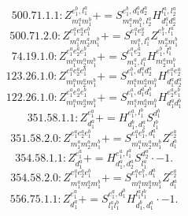 \documentclass[letterpaper,10pt,fleqn,leqno,onecolumn]{article}
\begin{document}
\begin{equation} \;\;\;\;\;\;  500.71.1.1: Z^{e_{1}^{b},l_{1}^{a}}_{m_{1}^{a}m_{1}^{b}}+=S^{e_{1}^{b},d_{1}^{a}d_{2}^{a}}_{m_{1}^{a}m_{1}^{b},l_{2}^{a}}H^{l_{1}^{a},l_{2}^{a}}_{d_{1}^{a}d_{2}^{a}} \end{equation}
\begin{equation} \;\;\;\;\;\;  500.71.2.0: Z^{e_{1}^{a}e_{2}^{a}e_{1}^{b}}_{m_{1}^{a}m_{2}^{a}m_{1}^{b}}+=S^{e_{1}^{a}e_{2}^{a}}_{m_{1}^{a},l_{1}^{a}}Z^{e_{1}^{b},l_{1}^{a}}_{m_{2}^{a}m_{1}^{b}} \end{equation}
\begin{equation} \;\;\;\;\;\;  74.19.1.0: Z^{e_{1}^{a}e_{2}^{a}e_{1}^{b}}_{m_{1}^{a}m_{2}^{a}m_{1}^{b}}+=S^{e_{1}^{a}e_{2}^{a}}_{m_{1}^{a},l_{1}^{a}}H^{e_{1}^{b},l_{1}^{a}}_{m_{2}^{a}m_{1}^{b}} \end{equation}
\begin{equation} \;\;\;\;\;\;  123.26.1.0: Z^{e_{1}^{a}e_{2}^{a}e_{1}^{b}}_{m_{1}^{a}m_{2}^{a}m_{1}^{b}}+=S^{e_{1}^{b},d_{1}^{a}d_{2}^{a}}_{m_{1}^{a}m_{2}^{a}m_{1}^{b}}H^{e_{1}^{a}e_{2}^{a}}_{d_{1}^{a}d_{2}^{a}} \end{equation}
\begin{equation} \;\;\;\;\;\;  122.26.1.0: Z^{e_{1}^{a}e_{2}^{a}e_{1}^{b}}_{m_{1}^{a}m_{2}^{a}m_{1}^{b}}+=S^{e_{1}^{a},d_{1}^{a}d_{1}^{b}}_{m_{1}^{a}m_{2}^{a}m_{1}^{b}}H^{e_{2}^{a}e_{1}^{b}}_{d_{1}^{a}d_{1}^{b}} \end{equation}
\begin{equation} \;\;\;\;\;\;  351.58.1.1: Z^{e_{1}^{a}}_{d_{1}^{a}}+=H^{e_{1}^{a},l_{1}^{b}}_{d_{1}^{b},d_{1}^{a}}S^{d_{1}^{b}}_{l_{1}^{b}} \end{equation}
\begin{equation} \;\;\;\;\;\;  351.58.2.0: Z^{e_{1}^{a}e_{2}^{a}e_{1}^{b}}_{m_{1}^{a}m_{2}^{a}m_{1}^{b}}+=S^{e_{1}^{a}e_{1}^{b},d_{1}^{a}}_{m_{1}^{a}m_{2}^{a}m_{1}^{b}}Z^{e_{2}^{a}}_{d_{1}^{a}} \end{equation}
\begin{equation} \;\;\;\;\;\;  354.58.1.1: Z^{e_{1}^{a}}_{d_{1}^{a}}+=H^{e_{1}^{a},l_{1}^{a}}_{d_{1}^{a},d_{2}^{a}}S^{d_{2}^{a}}_{l_{1}^{a}}\cdot -1. \end{equation}
\begin{equation} \;\;\;\;\;\;  354.58.2.0: Z^{e_{1}^{a}e_{2}^{a}e_{1}^{b}}_{m_{1}^{a}m_{2}^{a}m_{1}^{b}}+=S^{e_{1}^{a}e_{1}^{b},d_{1}^{a}}_{m_{1}^{a}m_{2}^{a}m_{1}^{b}}Z^{e_{2}^{a}}_{d_{1}^{a}} \end{equation}
\begin{equation} \;\;\;\;\;\;  556.75.1.1: Z^{e_{1}^{a}}_{d_{1}^{a}}+=S^{e_{1}^{a},d_{1}^{b}}_{l_{1}^{a}l_{1}^{b}}H^{l_{1}^{a}l_{1}^{b}}_{d_{1}^{b},d_{1}^{a}}\cdot -1. \end{equation}
\end{document}
